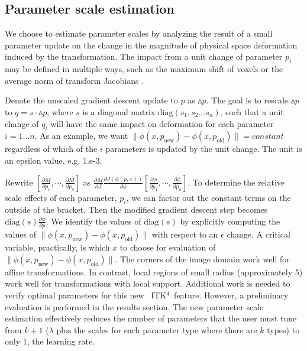 \documentclass{llncs}
\newcommand{\tk}{~ITK$^{\text{4}}$~}
\begin{document}
\subsection{Parameter scale estimation}
We choose to estimate parameter scales by analyzing the result of a
small parameter update on the change in the magnitude of physical space deformation
induced by the transformation.  The impact from a unit change of
parameter $p_i$ may be defined in multiple ways, such as the maximum shift of
voxels or the average norm of transform Jacobians \cite{Jenkinson2001}.

Denote the unscaled gradient descent update to $p$ as $\vartriangle
p$.  The goal is to rescale $\vartriangle p$ to $q = s \cdot \vartriangle p$, where $s$ is a diagonal
matrix $\text{diag} (s_1, s_2 \ldots s_n)$, such that a unit change of $q_i$ will have
the same impact on deformation for each parameter $i = 1... n$.   
As an example, we want $ \| \phi(x,p_{\text{new}}) -
\phi(x,p_\text{old}) \| = constant $ regardless of which of the
$i$ parameters is updated by the unit change.  The unit is an epsilon
value, e.g. 1.e-3.

Rewrite $[ \frac{\partial
  M}{\partial p_1} , \cdots , \frac{\partial
  M}{\partial p_n} 
 ]$ as $\frac{\partial M}{\partial J}\frac{\partial
  J(\phi(p,x))}{\partial \phi} [ \frac{\partial \phi}{\partial p_1} , \cdots , \frac{\partial \phi}{\partial p_n} ]$.
To determine the relative scale effects of each parameter, $p_i$, we
can factor out the constant terms on the outside of the bracket.  
Then the modified gradient descent step becomes
$\text{diag}(s)\frac{\partial \phi}{\partial p}$.  We identify the values
of $\text{diag}(s)$ by explicitly computing the values of $\| \phi(x,p_{\text{new}}) -
\phi(x,p_\text{old}) \| $ with respect to an $\epsilon$ change.  A critical variable,
practically, is which $x$ to choose for evaluation of $\| \phi(x,p_{\text{new}}) -
\phi(x,p_\text{old}) \| $.  The corners of the image domain work well
for affine transformations.  In contrast, local regions of small radius
(approximately 5) work well for transformations with local support.
Additional work is needed to verify optimal parameters for this new
\tk feature.  However, a preliminary evaluation is performed in the results
section.  The new parameter scale estimation effectively reduces the number of parameters
that the user must tune from $k+1$ ($\lambda$ plus the scales for each
parameter type where there are $k$ types) to only 1, the learning
rate.  
\end{document}

